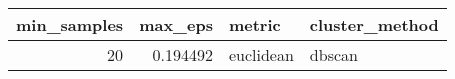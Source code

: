 \begin{tabular}{rrll}
\toprule
min_samples & max_eps & metric & cluster_method \\
\midrule
20 & 0.194492 & euclidean & dbscan \\
\bottomrule
\end{tabular}
